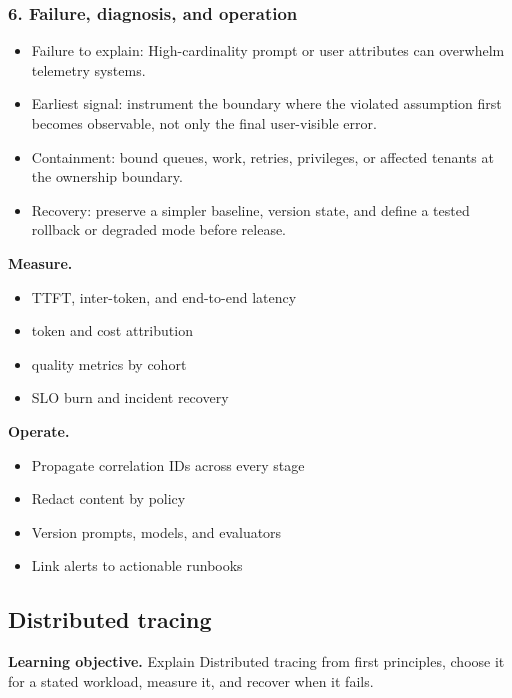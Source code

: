 \subsubsection*{6. Failure, diagnosis, and operation}
\begin{itemize}
\item Failure to explain: High-cardinality prompt or user attributes can overwhelm telemetry systems.
\item Earliest signal: instrument the boundary where the violated assumption first becomes observable, not only the final user-visible error.
\item Containment: bound queues, work, retries, privileges, or affected tenants at the ownership boundary.
\item Recovery: preserve a simpler baseline, version state, and define a tested rollback or degraded mode before release.
\end{itemize}
\textbf{Measure.}\begin{itemize}
\item TTFT, inter-token, and end-to-end latency
\item token and cost attribution
\item quality metrics by cohort
\item SLO burn and incident recovery
\end{itemize}
\textbf{Operate.}\begin{itemize}
\item Propagate correlation IDs across every stage
\item Redact content by policy
\item Version prompts, models, and evaluators
\item Link alerts to actionable runbooks
\end{itemize}
\subsection{Distributed tracing}
\textbf{Learning objective.} Explain Distributed tracing from first principles, choose it for a stated workload, measure it, and recover when it fails.
